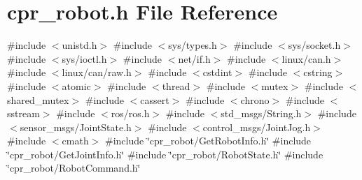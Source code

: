 \section{cpr\+\_\+robot.\+h File Reference}
\label{cpr__robot_8h}
{\ttfamily \#include $<$unistd.\+h$>$}\newline
{\ttfamily \#include $<$sys/types.\+h$>$}\newline
{\ttfamily \#include $<$sys/socket.\+h$>$}\newline
{\ttfamily \#include $<$sys/ioctl.\+h$>$}\newline
{\ttfamily \#include $<$net/if.\+h$>$}\newline
{\ttfamily \#include $<$linux/can.\+h$>$}\newline
{\ttfamily \#include $<$linux/can/raw.\+h$>$}\newline
{\ttfamily \#include $<$cstdint$>$}\newline
{\ttfamily \#include $<$cstring$>$}\newline
{\ttfamily \#include $<$atomic$>$}\newline
{\ttfamily \#include $<$thread$>$}\newline
{\ttfamily \#include $<$mutex$>$}\newline
{\ttfamily \#include $<$shared\+\_\+mutex$>$}\newline
{\ttfamily \#include $<$cassert$>$}\newline
{\ttfamily \#include $<$chrono$>$}\newline
{\ttfamily \#include $<$sstream$>$}\newline
{\ttfamily \#include $<$ros/ros.\+h$>$}\newline
{\ttfamily \#include $<$std\+\_\+msgs/\+String.\+h$>$}\newline
{\ttfamily \#include $<$sensor\+\_\+msgs/\+Joint\+State.\+h$>$}\newline
{\ttfamily \#include $<$control\+\_\+msgs/\+Joint\+Jog.\+h$>$}\newline
{\ttfamily \#include $<$cmath$>$}\newline
{\ttfamily \#include \char`\"{}cpr\+\_\+robot/\+Get\+Robot\+Info.\+h\char`\"{}}\newline
{\ttfamily \#include \char`\"{}cpr\+\_\+robot/\+Get\+Joint\+Info.\+h\char`\"{}}\newline
{\ttfamily \#include \char`\"{}cpr\+\_\+robot/\+Robot\+State.\+h\char`\"{}}\newline
{\ttfamily \#include \char`\"{}cpr\+\_\+robot/\+Robot\+Command.\+h\char`\"{}}\newline
